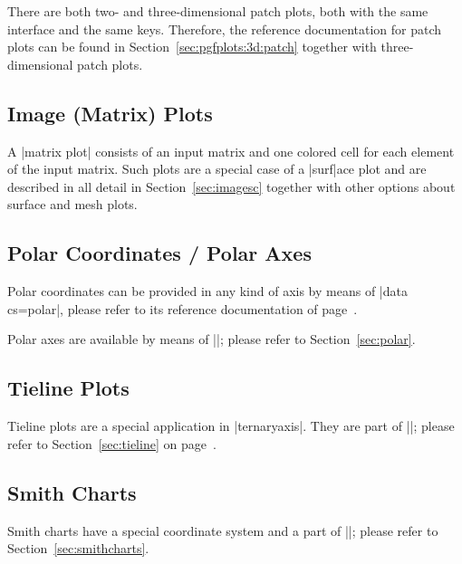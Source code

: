 {There are both two- and three-dimensional patch plots, both with the same
interface and the same keys. Therefore, the reference documentation for patch
plots can be found in Section~\ref{sec:pgfplots:3d:patch} together with
three-dimensional patch plots.


\subsection{Image (Matrix) Plots}

A |matrix plot| consists of an input matrix and one colored cell for each
element of the input matrix. Such plots are a special case of a |surf|ace plot
and are described in all detail in Section~\ref{sec:imagesc} together with
other options about surface and mesh plots.


\subsection{Polar Coordinates / Polar Axes}

Polar coordinates can be provided in any kind of axis by means of
|data cs=polar|, please refer to its reference documentation of
page~\pageref{key:data:cs}.

Polar axes are available by means of ||; please refer
to Section~\ref{sec:polar}.


\subsection{Tieline Plots}

Tieline plots are a special application in |ternaryaxis|. They are part of
||; please refer to Section~\ref{sec:tieline} on
page~\pageref{sec:tieline}.


\subsection{Smith Charts}

Smith charts have a special coordinate system and a part of
||; please refer to
Section~\ref{sec:smithcharts}.

}
